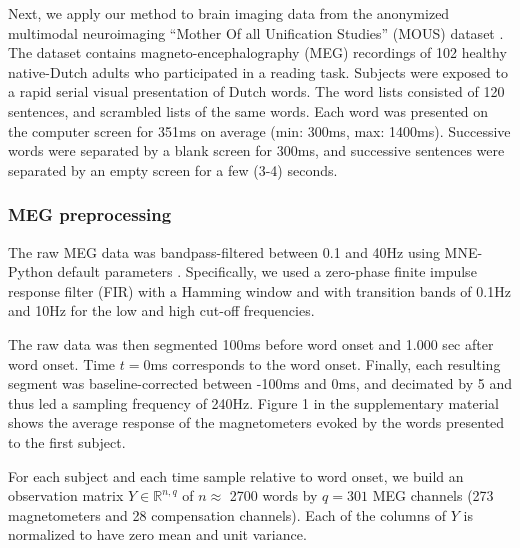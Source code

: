 
Next, we apply our method to brain imaging data from the anonymized multimodal
neuroimaging ``Mother Of all Unification Studies'' (MOUS) dataset
\citep{schoffelen2019204}. The dataset contains magneto-encephalography (MEG)
recordings of 102 healthy native-Dutch adults who participated in a reading
task.
%
Subjects were exposed to a rapid serial visual presentation of Dutch words. The
word lists consisted of 120 sentences, and scrambled lists of the same words.
Each word was presented on the computer screen for 351ms on average (min: 300ms,
max: 1400ms). Successive words were separated by a blank screen for 300ms, and
successive sentences were separated by an empty screen for a few (3-4) seconds.

\subsubsection{MEG preprocessing}

The raw MEG data was bandpass-filtered between 0.1 and 40Hz using MNE-Python
default parameters \citep{gramfort2013meg, gramfort2014mne}. Specifically, we used a zero-phase finite impulse
response filter (FIR) with a Hamming window and with transition bands of 0.1Hz
and 10Hz for the low and high cut-off frequencies.

The raw data was then segmented 100ms before word onset and 1.000 sec after
word onset. Time $t=0$ms corresponds to the word onset. Finally, each resulting
segment was baseline-corrected between -100ms and 0ms, and decimated by 5 and
thus led a sampling frequency of 240Hz. Figure 1 in the supplementary material
shows the average response of the magnetometers evoked by the words presented
to the first subject.

For each subject and each time sample relative to word onset, we
build an observation matrix $Y \in \mathbb{R}^{n, q}$ of $n\approx$ 2700 words
by $q=301$ MEG channels (273 magnetometers and 28 compensation channels). Each
of the columns of $Y$ is normalized to have zero mean and unit variance.

